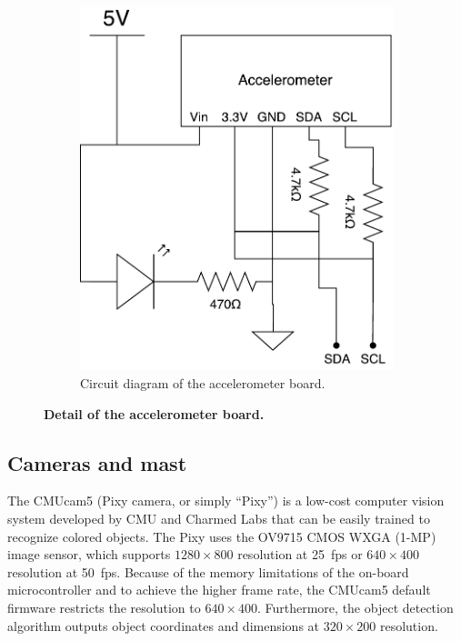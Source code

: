 \documentclass[letterpaper, 11pt]{article}
\begin{document}
\begin{figure}[ht]
\begin{subfigure}[t]{0.48\textwidth}
        \includegraphics[height=0.4\textheight]{images/accel-schematic.pdf}
        \caption{Circuit diagram of the accelerometer board.}
    \end{subfigure}
    \caption{\textbf{Detail of the accelerometer board.}}
    \label{fig:accel-board}
\end{figure}

\subsection{Cameras and mast}
The CMUcam5 (Pixy camera, or simply ``Pixy'') is a low-cost computer vision system developed by CMU and Charmed Labs that can be easily trained to recognize colored objects. The Pixy uses the OV9715 CMOS WXGA (1-MP) image sensor, which supports $1280\times 800$ resolution at \SI{25}{fps} or $640\times 400$ resolution at \SI{50}{fps}. Because of the memory limitations of the on-board microcontroller and to achieve the higher frame rate, the CMUcam5 default firmware restricts the resolution to $640\times 400$. Furthermore, the object detection algorithm outputs object coordinates and dimensions at $320\times 200$ resolution.
\end{document}
